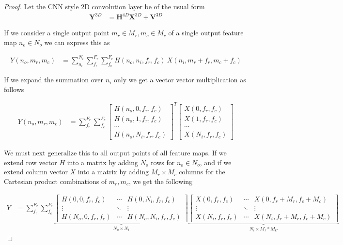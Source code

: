 \documentclass[11pt]{article}
\begin{document}
\begin{proof}
	Let the CNN style 2D convolution layer be of the usual form
	\begin{align}
		\boldsymbol{Y}^{3D} &= \boldsymbol{H}^{4D}\boldsymbol{X}^{3D} +
		\boldsymbol{V}^{3D}
	\end{align}

	If we consider a single output point $m_r \in M_r, m_c \in M_c$
	of a single output feature map $n_o \in N_o$
	we can express this as

	\begin{align}
		Y(n_o, m_r, m_c) &= \sum_{n_i}^{N_i}\sum_{f_r}^{F_r}\sum_{f_c}^{F_c}
		H(n_o, n_i, f_r, f_c)\ X(n_i, m_r + f_r, m_c + f_c)
	\end{align}

	If we expand the summation over $n_i$ only we get a vector vector
	multiplication as follows

	\begin{align}
		Y(n_o, m_r, m_c) &= \sum_{f_r}^{F_r}\sum_{f_c}^{F_c}
		\begin{bmatrix}
			H(n_o, 0, f_r, f_c) \\ H(n_o, 1, f_r, f_c) \\ \cdots \\ H(n_o, N_i, f_r, f_c)
		\end{bmatrix}^T
		\begin{bmatrix}
			X(0, f_r, f_c) \\ X(1, f_r, f_c) \\ \cdots \\ X(N_i, f_r, f_c)
		\end{bmatrix}
	\end{align}

	We must next generalize this to all output points of all feature maps. If
	we extend row vector $H$ into a matrix by adding $N_o$ rows for
	$n_o \in N_o$, and if we
	extend column vector $X$ into a matrix by adding $M_r \times M_c$ columns
	for the Cartesian product combinations of $m_r, m_c$, we get the following

	\begin{align}
		Y &= \sum_{f_r}^{F_r}\sum_{f_c}^{F_c}
		\underbrace{
			\begin{bmatrix}
				H(0, 0, f_r, f_c) &  \cdots &
					H(0, N_i,f_r, f_c) \\
				\vdots & \ddots & \vdots \\
				H(N_o, 0, f_r, f_c) &  \cdots &
				H(N_o, N_i,f_r, f_c)
			\end{bmatrix}
		}_{N_o \times N_i}
		\underbrace{
			\begin{bmatrix}
				X(0, f_r, f_c) & \cdots & X(0, f_r+M_r, f_c+M_c) \\
				\vdots & \ddots & \vdots \\
				X(N_i, f_r, f_c) & \cdots & X(N_i, f_r+M_r, f_c+M_c)
			\end{bmatrix}
		}_{N_i \times M_r * M_C}
	\end{align}


\end{proof}
\end{document}
